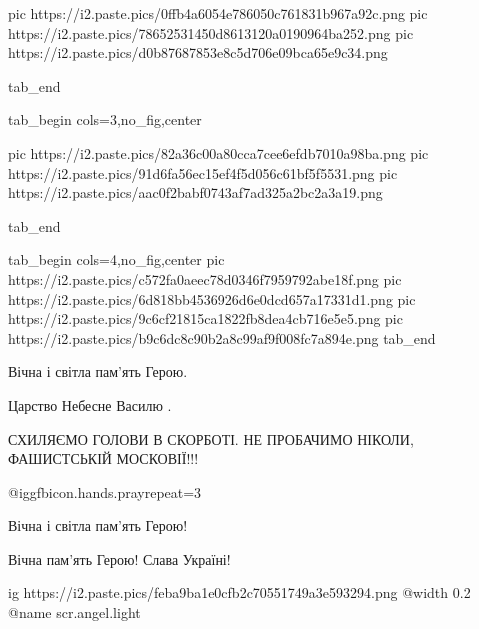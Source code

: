 \begin{itemize}
		 pic https://i2.paste.pics/0ffb4a6054e786050c761831b967a92c.png
		 pic https://i2.paste.pics/78652531450d8613120a0190964ba252.png
		 pic https://i2.paste.pics/d0b87687853e8c5d706e09bca65e9c34.png

  tab_end

  tab_begin cols=3,no_fig,center

		 pic https://i2.paste.pics/82a36c00a80cca7cee6efdb7010a98ba.png
		 pic https://i2.paste.pics/91d6fa56ec15ef4f5d056c61bf5f5531.png
		 pic https://i2.paste.pics/aac0f2babf0743af7ad325a2bc2a3a19.png

  tab_end

  tab_begin cols=4,no_fig,center
		pic https://i2.paste.pics/c572fa0aeec78d0346f7959792abe18f.png
		pic https://i2.paste.pics/6d818bb4536926d6e0dcd657a17331d1.png
		pic https://i2.paste.pics/9c6cf21815ca1822fb8dea4cb716e5e5.png
		pic https://i2.paste.pics/b9c6dc8c90b2a8c99af9f008fc7a894e.png
  tab_end
\fi

Вічна і світла пам'ять Герою.

Царство Небесне Василю .

СХИЛЯЄМО ГОЛОВИ В СКОРБОТІ.
НЕ ПРОБАЧИМО НІКОЛИ, ФАШИСТСЬКІЙ МОСКОВІЇ!!!

 @igg{fbicon.hands.pray}{repeat=3} 

Вічна і світла пам'ять Герою!

Вічна пам'ять Герою! Слава Україні!


\ifcmt
  ig https://i2.paste.pics/feba9ba1e0cfb2c70551749a3e593294.png
  @width 0.2
	@name scr.angel.light
\fi

\end{itemize} %
